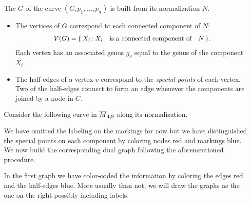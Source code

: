 \documentclass[12pt]{memoir}
\begin{document}
\begin{Def}
    The  $G$ of the curve $(C,
p_1,\dots,p_n)$ is built from its normalization $N$. 
\begin{itemize}
    \item The vertices of $G$ correspond to each connected component of $N$:
    $$V(G)=\{\,X_i\mathbin{:} X_i\quad\text{is a connected component of}\quad N\,\}.$$
    Each vertex has an associated genus $g_v$ equal to the genus of the component $X_i$.
    \item The half-edges of a vertex $v$ correspond to the \emph{special points} of each vertex. Two of the half-edges connect to form an edge whenever the components are joined by a node in $C$.
\end{itemize}
\end{Def}

\begin{Ex}
    Consider the following curve in $\overline M_{4,9}$ along its normalization.

    We have omitted the labeling on the markings for now but we have distinguished the special points on each component by coloring nodes red and markings blue. We now build the corresponding dual graph following the aforementioned procedure.

    In the first graph we have color-coded the information by coloring the edges red and the half-edges blue. More usually than not, we will draw the graphs as the one on the right possibly including labels.
\end{Ex}
\end{document}
